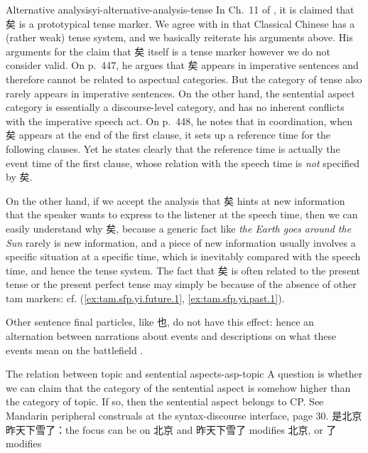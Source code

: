 \documentclass[UTF8, a4paper, oneside, scheme=plain, 12pt]{ctexrep}
\newcommand*{\citechap}[1]{Ch.~{#1}}
\newcommand*{\citepage}[1]{p.~{#1}}
\newcommand*{\citepages}[1]{pp.~{#1}}
\newcommand{\form}[1]{\emph{#1}}
\begin{document}
\begin{infobox}{Alternative analysis}{yi-alternative-analysis-tense}
    In \citechap{11} of \citet{meiguang2018}, it is claimed that 矣 is a prototypical tense marker.
    We agree with \citet{meiguang2018} in that Classical Chinese has a (rather weak) tense system, and we basically reiterate his arguments above.
    His arguments for the claim that 矣 itself is a tense marker however we do not consider valid.
    On \citepage{447}, he argues that 矣 appears in imperative sentences and therefore cannot be related to aspectual categories.
    But the category of tense also rarely appears in imperative sentences.
    On the other hand, the sentential aspect category is essentially a discourse-level category, and has no inherent conflicts with the imperative speech act.
    On \citepage{448}, he notes that in coordination, when 矣 appears at the end of the first clause, it sets up a reference time for the following clauses.
    Yet he states clearly that the reference time is actually the event time of the first clause,
    whose relation with the speech time is \emph{not} specified by 矣.

    On the other hand, if we accept the analysis that 矣 hints at new information that the speaker wants to express to the listener at the speech time,
    then we can easily understand why 矣,
    because a generic fact like \form{the Earth goes around the Sun} rarely is new information,
    and a piece of new information usually involves a specific situation at a specific time,
    which is inevitably compared with the speech time, and hence the tense system.
    The fact that 矣 is often related to the present tense or the present perfect tense 
    may simply be because of the absence of other \ac{tam} markers:
    cf. (\ref{ex:tam.sfp.yi.future.1}, \ref{ex:tam.sfp.yi.past.1}).
\end{infobox}

Other sentence final particles, like 也, do not have this effect:
hence an alternation between narrations about events 
and descriptions on what these events mean on the battlefield
\citep[\citepages{444-445}]{meiguang2018}.

\begin{todobox}{The relation between topic and sentential aspect}{s-asp-topic}
    A question is whether we can claim that the category of the sentential aspect
    is somehow higher than the category of topic.
    If so, then the sentential aspect belongs to CP.
    See Mandarin peripheral construals at the syntax-discourse interface, page 30.
    是北京昨天下雪了：the focus can be on 北京 and 昨天下雪了 modifies 北京,
    or 了 modifies 
\end{todobox}
\end{document}
